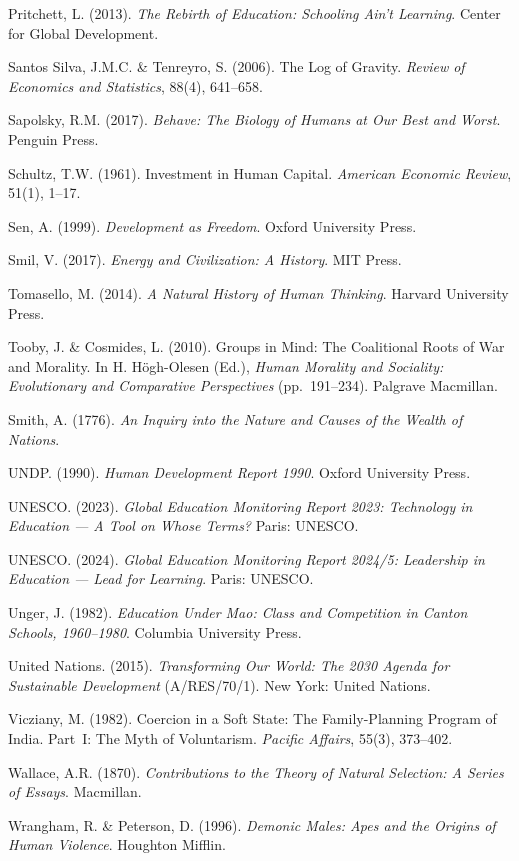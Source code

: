 \documentclass[12pt,letterpaper]{article}
\begin{document}
Pritchett, L. (2013). \emph{The Rebirth of Education: Schooling Ain't
Learning}. Center for Global Development.

Santos Silva, J.M.C. \& Tenreyro, S. (2006). The Log of Gravity.
\emph{Review of Economics and Statistics}, 88(4), 641--658.

Sapolsky, R.M. (2017). \emph{Behave: The Biology of Humans at Our
Best and Worst}. Penguin Press.

Schultz, T.W. (1961). Investment in Human Capital.
\emph{American Economic Review}, 51(1), 1--17.

Sen, A. (1999). \emph{Development as Freedom}. Oxford University Press.

Smil, V. (2017). \emph{Energy and Civilization: A History}. MIT Press.

Tomasello, M. (2014). \emph{A Natural History of Human Thinking}.
Harvard University Press.

Tooby, J. \& Cosmides, L. (2010). Groups in Mind: The Coalitional Roots
of War and Morality. In H. H\"{o}gh-Olesen (Ed.), \emph{Human Morality
and Sociality: Evolutionary and Comparative Perspectives} (pp.~191--234).
Palgrave Macmillan.

Smith, A. (1776). \emph{An Inquiry into the Nature and Causes of the
Wealth of Nations}.

UNDP. (1990). \emph{Human Development Report 1990}. Oxford University
Press.

UNESCO. (2023). \emph{Global Education Monitoring Report 2023:
Technology in Education --- A Tool on Whose Terms?} Paris: UNESCO.

UNESCO. (2024). \emph{Global Education Monitoring Report 2024/5:
Leadership in Education --- Lead for Learning}. Paris: UNESCO.

Unger, J. (1982). \emph{Education Under Mao: Class and Competition in
Canton Schools, 1960--1980}. Columbia University Press.

United Nations. (2015). \emph{Transforming Our World: The 2030 Agenda
for Sustainable Development} (A/RES/70/1). New York: United Nations.

Vicziany, M. (1982). Coercion in a Soft State: The Family-Planning
Program of India. Part~I: The Myth of Voluntarism. \emph{Pacific
Affairs}, 55(3), 373--402.

Wallace, A.R. (1870). \emph{Contributions to the Theory of Natural
Selection: A Series of Essays}. Macmillan.

Wrangham, R. \& Peterson, D. (1996). \emph{Demonic Males: Apes and
the Origins of Human Violence}. Houghton Mifflin.
\end{document}
